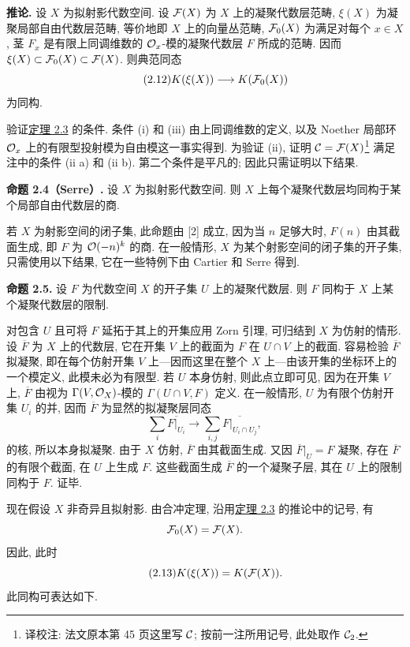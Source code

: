 \textbf{推论.} 设 $X$ 为拟射影代数空间. 设 $\mathcal F(X)$ 为 $X$ 上的凝聚代数层范畴, $\xi(X)$ 为凝聚局部自由代数层范畴, 等价地即 $X$ 上的向量丛范畴, $\mathcal F_0(X)$ 为满足对每个 $x\in X$, 茎 $F_x$ 是有限上同调维数的 $\mathcal O_x$-模的凝聚代数层 $F$ 所成的范畴. 因而 $\xi(X)\subset\mathcal F_0(X)\subset\mathcal F(X)$. 则典范同态
\begin{equation}\tag{2.12}
 K(\xi(X))\longrightarrow K(\mathcal F_0(X))
\end{equation}
为同构.

验证\hyperlink{sga6.e00.thm.2-3}{定理 2.3} 的条件. 条件 (i) 和 (iii) 由上同调维数的定义, 以及 Noether 局部环 $\mathcal O_x$ 上的有限型投射模为自由模这一事实得到. 为验证 (ii), 证明 $\mathcal C=\mathcal F(X)$\footnote{译校注: 法文原本第 45 页这里写 $\mathcal C$; 按前一注所用记号, 此处取作 $\mathcal C_2$.} 满足注中的条件 (ii a) 和 (ii b). 第二个条件是平凡的; 因此只需证明以下结果.

\textbf{命题 2.4（Serre）.} 设 $X$ 为拟射影代数空间. 则 $X$ 上每个凝聚代数层均同构于某个局部自由代数层的商.

若 $X$ 为射影空间的闭子集, 此命题由 [2] 成立, 因为当 $n$ 足够大时, $F(n)$ 由其截面生成, 即 $F$ 为 $\mathcal O(-n)^k$ 的商. 在一般情形, $X$ 为某个射影空间的闭子集的开子集, 只需使用以下结果, 它在一些特例下由 Cartier 和 Serre 得到.

\textbf{命题 2.5.} 设 $F$ 为代数空间 $X$ 的开子集 $U$ 上的凝聚代数层. 则 $F$ 同构于 $X$ 上某个凝聚代数层的限制.

对包含 $U$ 且可将 $F$ 延拓于其上的开集应用 Zorn 引理, 可归结到 $X$ 为仿射的情形. 设 $\overline F$ 为 $X$ 上的代数层, 它在开集 $V$ 上的截面为 $F$ 在 $U\cap V$ 上的截面. 容易检验 $\overline F$ 拟凝聚, 即在每个仿射开集 $V$ 上---因而这里在整个 $X$ 上---由该开集的坐标环上的一个模定义, 此模未必为有限型. 若 $U$ 本身仿射, 则此点立即可见, 因为在开集 $V$ 上, $\overline F$ 由视为 $\Gamma(V,\mathcal O_X)$-模的 $\Gamma(U\cap V,F)$ 定义. 在一般情形, $U$ 为有限个仿射开集 $U_i$ 的并, 因而 $\overline F$ 为显然的拟凝聚层同态
\[
 \sum_i \overline{F|_{U_i}}\longrightarrow \sum_{i,j}\overline{F|_{U_i\cap U_j}},
\]
的核, 所以本身拟凝聚. 由于 $X$ 仿射, $\overline F$ 由其截面生成. 又因 $\overline F|_U=F$ 凝聚, 存在 $\overline F$ 的有限个截面, 在 $U$ 上生成 $F$. 这些截面生成 $\overline F$ 的一个凝聚子层, 其在 $U$ 上的限制同构于 $F$. 证毕.

现在假设 $X$ 非奇异且拟射影. 由合冲定理, 沿用\hyperlink{sga6.e00.thm.2-3}{定理 2.3} 的推论中的记号, 有
\[
 \mathcal F_0(X)=\mathcal F(X).
\]
因此, 此时
\begin{equation}\tag{2.13}
 K(\xi(X))=K(\mathcal F(X)).
\end{equation}
此同构可表达如下.

